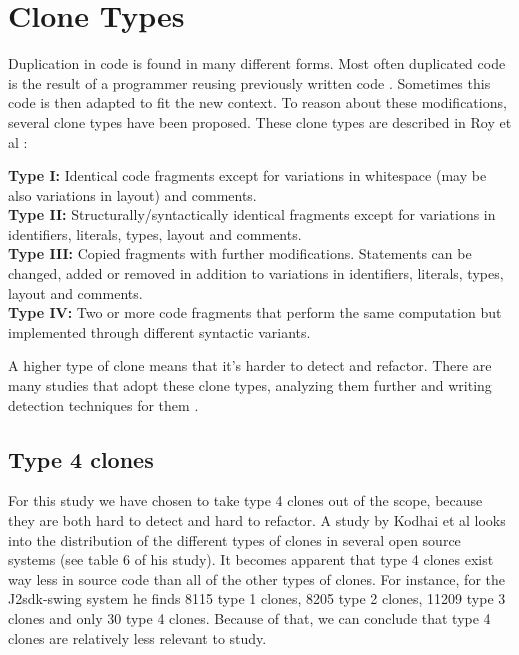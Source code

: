 \section{Clone Types} \label{chap:backgroundclonetypes}
Duplication in code is found in many different forms. Most often duplicated code is the result of a programmer reusing previously written code \cite{haefliger2008code, baxter1998clone}. Sometimes this code is then adapted to fit the new context. To reason about these modifications, several clone types have been proposed. These clone types are described in Roy et al \cite{roy2007survey}:
\begin{displayquote}
\textbf{Type I:} Identical code fragments except for variations in whitespace (may be also variations in layout) and comments.\\
\textbf{Type II:} Structurally/syntactically identical fragments except for variations in identifiers, literals, types, layout and comments.\\
\textbf{Type III:} Copied fragments with further modifications. Statements can be changed, added or removed in addition to variations in identifiers, literals, types, layout and comments.\\
\textbf{Type IV:} Two or more code fragments that perform the same computation but implemented through different syntactic variants.
\end{displayquote}
A higher type of clone means that it's harder to detect and refactor. There are many studies that adopt these clone types, analyzing them further and writing detection techniques for them \cite{sajnani2016sourcerercc, kodhai2010detection, van2019novel}.

\subsection{Type 4 clones}
For this study we have chosen to take type 4 clones out of the scope, because they are both hard to detect and hard to refactor. A study by Kodhai et al \cite{kodhai2013method} looks into the distribution of the different types of clones in several open source systems (see table 6 of his study). It becomes apparent that type 4 clones exist way less in source code than all of the other types of clones. For instance, for the J2sdk-swing system he finds 8115 type 1 clones, 8205 type 2 clones, 11209 type 3 clones and only 30 type 4 clones. Because of that, we can conclude that type 4 clones are relatively less relevant to study.

